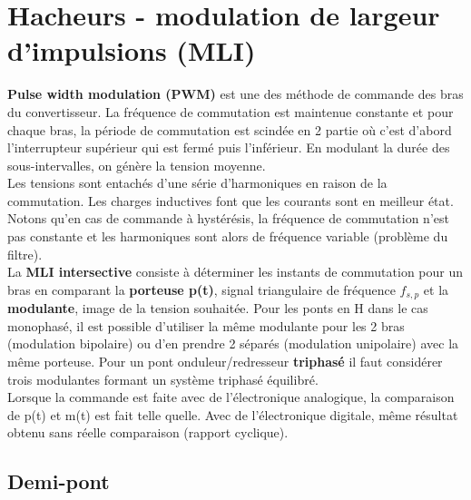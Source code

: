 \section{Hacheurs - modulation de largeur d'impulsions (MLI)}
	 \textbf{Pulse width modulation (PWM)} est une des méthode de commande des bras du convertisseur. La fréquence de commutation est maintenue constante et pour chaque bras, la période de commutation est scindée en 2 partie où c'est d'abord l'interrupteur supérieur qui est fermé puis l'inférieur. En modulant la durée des sous-intervalles, on génère la tension moyenne. \\
	 
	 Les tensions sont entachés d'une série d'harmoniques en raison de la commutation. Les charges inductives font que les courants sont en meilleur état. Notons qu'en cas de commande à hystérésis, la fréquence de commutation n'est pas constante et les harmoniques sont alors de fréquence variable (problème du filtre). \\
	 La \textbf{MLI intersective} consiste à déterminer les instants de commutation pour un bras en comparant la \textbf{porteuse p(t)}, signal triangulaire de fréquence $f_{s,p}$ et la \textbf{modulante}, image de la tension souhaitée. Pour les ponts en H dans le cas monophasé, il est possible d'utiliser la même modulante pour les 2 bras (modulation bipolaire) ou d'en prendre 2 séparés (modulation unipolaire) avec la même porteuse. Pour un pont onduleur/redresseur \textbf{triphasé} il faut considérer trois modulantes formant un système triphasé équilibré. \\
	 
	 Lorsque la commande est faite avec de l'électronique analogique, la comparaison de p(t) et m(t) est fait telle quelle. Avec de l'électronique digitale, même résultat obtenu sans réelle comparaison (rapport cyclique). 
	 
	 \subsection{Demi-pont}
